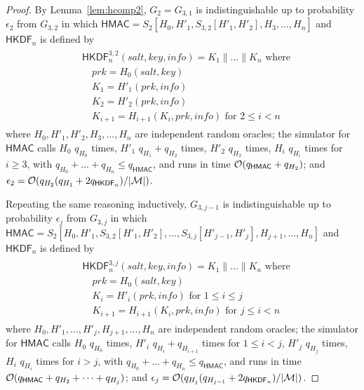 \documentclass[compsoc, conference, letterpaper, 10pt, times]{IEEEtran}
\newcommand{\HKDF}{\mathsf{HKDF}}
\newcommand{\salt}{\mathit{salt}}
\newcommand{\key}{\mathit{key}}
\newcommand{\info}{\mathit{info}}
\newcommand{\prk}{\mathit{prk}}
\newcommand{\hmac}{\mathsf{HMAC}}
\newcommand{\Smac}{\mathcal{M}}
\newcommand{\ab}{\allowbreak}
\begin{document}
\begin{proof}
By Lemma~\ref{lem:hcomp2}, $G_2 = G_{3,1}$ is
indistinguishable up to probability $\epsilon_2$ from $G_{3,2}$ in which
$\hmac = S_2[H_0, \ab H'_1, \ab S_{3,2}[H'_1, H'_2], \ab H_3, \ab \ldots, \ab H_n]$ and $\HKDF_n$ is defined by
\begin{align*}
\begin{split}
&\HKDF^{3,2}_n(\salt,\key,\info) = K_1 \| \dots \| K_n \text{ where}\\
&\quad \prk = H_0(\salt,\key)\\
&\quad K_1 = H'_1(\prk, \info )\\
&\quad K_2 = H'_2(\prk, \info )\\
&\quad K_{i+1} = H_{i+1}(K_i, \prk, \info) \text{ for }2 \leq i < n
\end{split}
\end{align*}
where $H_0, H'_1, H'_2, H_3, \dots, H_n$ are independent random oracles;
the simulator for $\hmac$ calls 
$H_0$ $q_{H_0}$ times,
$H'_1$ $q_{H_1} + q_{H_2}$ times,
$H'_2$ $q_{H_2}$ times, $H_i$ $q_{H_i}$ times for $i \geq 3$, with
$q_{H_0} + \dots + q_{H_n} \leq q_{\hmac}$, and runs in time 
${\cal O}(q_{\hmac} + q_{H_2})$; and
$\epsilon_2 = {\cal O}(q_{H_2}(q_{H_1} + 2 q_{\HKDF_n})/|\Smac|)$.

Repeating the same reasoning inductively, 
$G_{3,j-1}$ is
indistinguishable up to probability $\epsilon_{j}$ from $G_{3,j}$ in which
$\hmac = S_2[H_0, \ab H'_1, \ab S_{3,2}[H'_1, H'_2], \ab \dots, \ab S_{3,j}[H'_{j-1}, H'_{j}], \ab H_{j+1}, \ab \ldots, \ab H_n]$ and $\HKDF_n$ is defined by
\begin{align*}
\begin{split}
&\HKDF^{3,j}_n(\salt,\key,\info) = K_1 \| \dots \| K_n \text{ where}\\
&\quad \prk = H_0(\salt,\key)\\
&\quad K_i = H'_i(\prk, \info )\text{ for }1 \leq i \leq j\\
&\quad K_{i+1} = H_{i+1}(K_i, \prk, \info) \text{ for }j \leq i < n
\end{split}
\end{align*}
where $H_0, H'_1, \dots, H'_{j}, H_{j+1}, \dots, H_n$ are independent random oracles;
the simulator for $\hmac$ calls 
$H_0$ $q_{H_0}$ times,
$H'_i$ $q_{H_i} + q_{H_{i+1}}$ times for $1 \leq i < j$,
$H'_{j}$ $q_{H_{j}}$ times, $H_i$ $q_{H_i}$ times for $i > j$, with
$q_{H_0} + \dots + q_{H_n} \leq q_{\hmac}$, and runs in time 
${\cal O}(q_{\hmac} + q_{H_2} + \dots + q_{H_{j}})$; and
$\epsilon_{j} = {\cal O}(q_{H_{j}}(q_{H_{j-1}} + 2 q_{\HKDF_n})/|\Smac|)$.


\end{proof}
\end{document}
